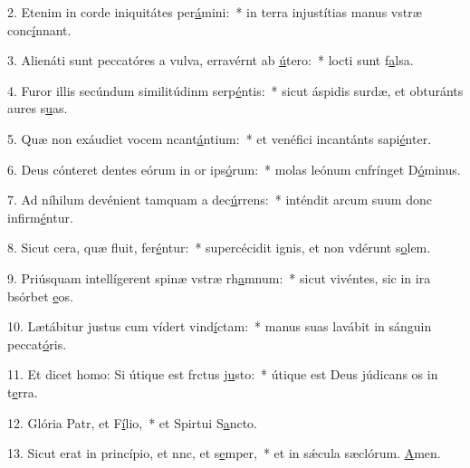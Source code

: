 2. Etenim in corde iniquitátes per\uline{á}mini:~* in terra injustítias manus vstræ conc\uline{í}nnant.\par 
3. Alienáti sunt peccatóres a vulva, erravérnt ab \uline{ú}tero:~* locti sunt f\uline{a}lsa.\par 
4. Furor illis secúndum similitúdinm serp\uline{é}ntis:~* sicut áspidis surdæ, et obturánts aures s\uline{u}as.\par 
5. Quæ non exáudiet vocem ncant\uline{á}ntium:~* et venéfici incantánts sapi\uline{é}nter.\par 
6. Deus cónteret dentes eórum in or ips\uline{ó}rum:~* molas leónum cnfrínget D\uline{ó}minus.\par 
7. Ad níhilum devénient tamquam a dec\uline{ú}rrens:~* inténdit arcum suum donc infirm\uline{é}ntur.\par 
8. Sicut cera, quæ fluit, fer\uline{é}ntur:~* supercécidit ignis, et non vdérunt s\uline{o}lem.\par 
9. Priúsquam intellígerent spinæ vstræ rh\uline{a}mnum:~* sicut vivéntes, sic in ira bsórbet \uline{e}os.\par 
10. Lætábitur justus cum vídert vind\uline{í}ctam:~* manus suas lavábit in sánguin peccat\uline{ó}ris.\par 
11. Et dicet homo: Si útique est frctus j\uline{u}sto:~* útique est Deus júdicans os in t\uline{e}rra.\par 
12. Glória Patr, et F\uline{í}lio,~* et Spirtui S\uline{a}ncto.\par 
13. Sicut erat in princípio, et nnc, et s\uline{e}mper,~* et in sǽcula sæclórum. \uline{A}men.\par 
